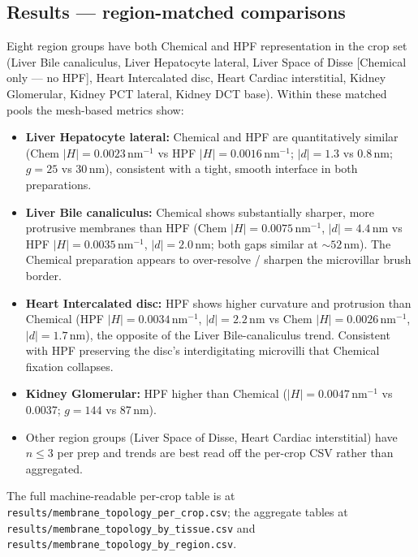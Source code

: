 

\subsection*{Results --- region-matched comparisons}

Eight region groups have both Chemical and HPF representation in the
crop set (Liver Bile canaliculus, Liver Hepatocyte lateral, Liver Space
of Disse [Chemical only --- no HPF], Heart Intercalated disc, Heart
Cardiac interstitial, Kidney Glomerular, Kidney PCT lateral, Kidney
DCT base). Within these matched pools the mesh-based metrics show:

\begin{itemize}[nosep]
\item \textbf{Liver Hepatocyte lateral:} Chemical and HPF are
quantitatively similar (Chem $|H| = 0.0023$\,nm$^{-1}$ vs HPF $|H|
= 0.0016$\,nm$^{-1}$; $|d| = 1.3$ vs 0.8\,nm; $g = 25$ vs 30\,nm),
consistent with a tight, smooth interface in both preparations.

\item \textbf{Liver Bile canaliculus:} Chemical shows substantially
sharper, more protrusive membranes than HPF (Chem $|H| =
0.0075$\,nm$^{-1}$, $|d| = 4.4$\,nm vs HPF $|H| = 0.0035$\,nm$^{-1}$,
$|d| = 2.0$\,nm; both gaps similar at $\sim 52$\,nm). The Chemical
preparation appears to over-resolve / sharpen the microvillar
brush border.

\item \textbf{Heart Intercalated disc:} HPF shows higher curvature
and protrusion than Chemical (HPF $|H| = 0.0034$\,nm$^{-1}$, $|d|
= 2.2$\,nm vs Chem $|H| = 0.0026$\,nm$^{-1}$, $|d| = 1.7$\,nm), the
opposite of the Liver Bile-canaliculus trend. Consistent with HPF
preserving the disc's interdigitating microvilli that Chemical
fixation collapses.

\item \textbf{Kidney Glomerular:} HPF higher than Chemical
($|H| = 0.0047$\,nm$^{-1}$ vs 0.0037; $g = 144$ vs 87\,nm).

\item Other region groups (Liver Space of Disse, Heart Cardiac
interstitial) have $n \leq 3$ per prep and trends are best read off
the per-crop CSV rather than aggregated.
\end{itemize}

The full machine-readable per-crop table is at
\texttt{results/membrane\_topology\_per\_crop.csv}; the aggregate
tables at \texttt{results/membrane\_topology\_by\_tissue.csv} and
\texttt{results/membrane\_topology\_by\_region.csv}.


